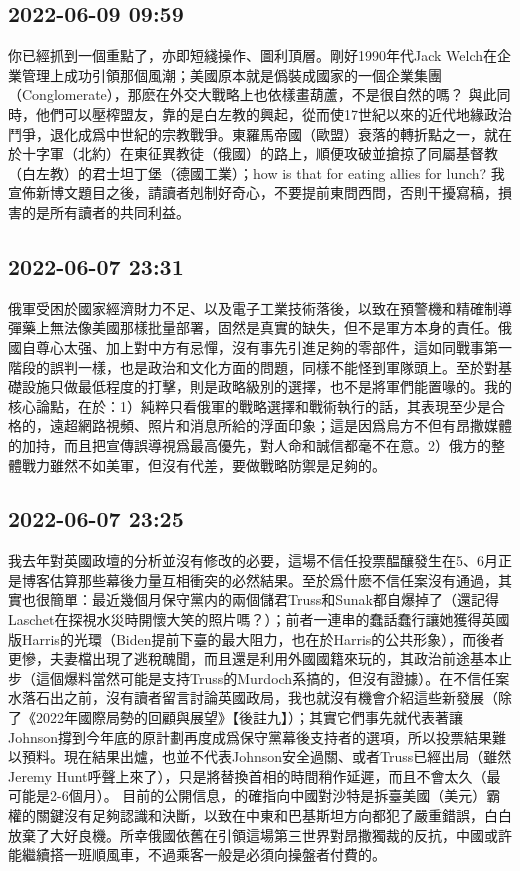\documentclass[twocolumn]{ctexart}
\begin{document}
\subsection*{2022-06-09 09:59}

你已經抓到一個重點了，亦即短綫操作、圖利頂層。剛好1990年代Jack Welch在企業管理上成功引領那個風潮；美國原本就是僞裝成國家的一個企業集團（Conglomerate），那麽在外交大戰略上也依樣畫葫蘆，不是很自然的嗎？
與此同時，他們可以壓榨盟友，靠的是白左教的興起，從而使17世紀以來的近代地緣政治鬥爭，退化成爲中世紀的宗教戰爭。東羅馬帝國（歐盟）衰落的轉折點之一，就在於十字軍（北約）在東征異教徒（俄國）的路上，順便攻破並搶掠了同屬基督教（白左教）的君士坦丁堡（德國工業）；how is that for eating allies for lunch?
我宣佈新博文題目之後，請讀者剋制好奇心，不要提前東問西問，否則干擾寫稿，損害的是所有讀者的共同利益。
\subsection*{2022-06-07 23:31}

俄軍受困於國家經濟財力不足、以及電子工業技術落後，以致在預警機和精確制導彈藥上無法像美國那樣批量部署，固然是真實的缺失，但不是軍方本身的責任。俄國自尊心太强、加上對中方有忌憚，沒有事先引進足夠的零部件，這如同戰事第一階段的誤判一樣，也是政治和文化方面的問題，同樣不能怪到軍隊頭上。至於對基礎設施只做最低程度的打擊，則是政略級別的選擇，也不是將軍們能置喙的。我的核心論點，在於：1）純粹只看俄軍的戰略選擇和戰術執行的話，其表現至少是合格的，遠超網路視頻、照片和消息所給的浮面印象；這是因爲烏方不但有昂撒媒體的加持，而且把宣傳誤導視爲最高優先，對人命和誠信都毫不在意。2）俄方的整體戰力雖然不如美軍，但沒有代差，要做戰略防禦是足夠的。
\subsection*{2022-06-07 23:25}

我去年對英國政壇的分析並沒有修改的必要，這場不信任投票醖釀發生在5、6月正是博客估算那些幕後力量互相衝突的必然結果。至於爲什麽不信任案沒有通過，其實也很簡單：最近幾個月保守黨内的兩個儲君Truss和Sunak都自爆掉了（還記得Laschet在探視水災時開懷大笑的照片嗎？）；前者一連串的蠢話蠢行讓她獲得英國版Harris的光環（Biden提前下臺的最大阻力，也在於Harris的公共形象），而後者更慘，夫妻檔出現了逃稅醜聞，而且還是利用外國國籍來玩的，其政治前途基本止步（這個爆料當然可能是支持Truss的Murdoch系搞的，但沒有證據）。在不信任案水落石出之前，沒有讀者留言討論英國政局，我也就沒有機會介紹這些新發展（除了《2022年國際局勢的回顧與展望》【後註九】）；其實它們事先就代表著讓Johnson撐到今年底的原計劃再度成爲保守黨幕後支持者的選項，所以投票結果難以預料。現在結果出爐，也並不代表Johnson安全過關、或者Truss已經出局（雖然Jeremy Hunt呼聲上來了），只是將替換首相的時間稍作延遲，而且不會太久（最可能是2-6個月）。
目前的公開信息，的確指向中國對沙特是拆臺美國（美元）霸權的關鍵沒有足夠認識和決斷，以致在中東和巴基斯坦方向都犯了嚴重錯誤，白白放棄了大好良機。所幸俄國依舊在引領這場第三世界對昂撒獨裁的反抗，中國或許能繼續搭一班順風車，不過乘客一般是必須向操盤者付費的。
\end{document}

